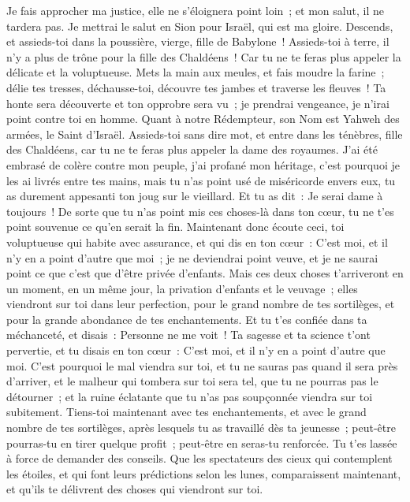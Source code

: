 \begin{multicols}{2}
Je fais approcher ma justice, elle ne s'éloignera point loin~; et mon salut, il ne tardera pas. Je mettrai le salut en Sion pour Israël, qui est ma gloire.
\VerseOne{}Descends, et assieds-toi dans la poussière, vierge, fille de Babylone~! Assieds-toi à terre, il n'y a plus de trône pour la fille des Chaldéens~! Car tu ne te feras plus appeler la délicate et la voluptueuse.
Mets la main aux meules, et fais moudre la farine~; délie tes tresses, déchausse-toi, découvre tes jambes et traverse les fleuves~!
Ta honte sera découverte et ton opprobre sera vu~; je prendrai vengeance, je n'irai point contre toi en homme.
Quant à notre Rédempteur, son Nom est Yahweh des armées, le Saint d'Israël.
Assieds-toi sans dire mot, et entre dans les ténèbres, fille des Chaldéens, car tu ne te feras plus appeler la dame des royaumes.
J'ai été embrasé de colère contre mon peuple, j'ai profané mon héritage, c'est pourquoi je les ai livrés entre tes mains, mais tu n'as point usé de miséricorde envers eux, tu as durement appesanti ton joug sur le vieillard.
Et tu as dit~: Je serai dame à toujours~! De sorte que tu n'as point mis ces choses-là dans ton cœur, tu ne t'es point souvenue ce qu'en serait la fin.
Maintenant donc écoute ceci, toi voluptueuse qui habite avec assurance, et qui dis en ton cœur~: C'est moi, et il n'y en a point d'autre que moi~; je ne deviendrai point veuve, et je ne saurai point ce que c'est que d'être privée d'enfants.
Mais ces deux choses t'arriveront en un moment, en un même jour, la privation d'enfants et le veuvage~; elles viendront sur toi dans leur perfection, pour le grand nombre de tes sortilèges, et pour la grande abondance de tes enchantements.
Et tu t'es confiée dans ta méchanceté, et disais~: Personne ne me voit~! Ta sagesse et ta science t'ont pervertie, et tu disais en ton cœur~: C'est moi, et il n'y en a point d'autre que moi.
 C'est pourquoi le mal viendra sur toi, et tu ne sauras pas quand il sera près d'arriver, et le malheur qui tombera sur toi sera tel, que tu ne pourras pas le détourner~; et la ruine éclatante que tu n'as pas soupçonnée viendra sur toi subitement.
Tiens-toi maintenant avec tes enchantements, et avec le grand nombre de tes sortilèges, après lesquels tu as travaillé dès ta jeunesse~; peut-être pourras-tu en tirer quelque profit~; peut-être en seras-tu renforcée.
Tu t'es lassée à force de demander des conseils. Que les spectateurs des cieux qui contemplent les étoiles, et qui font leurs prédictions selon les lunes, comparaissent maintenant, et qu'ils te délivrent des choses qui viendront sur toi.

\end{multicols}
